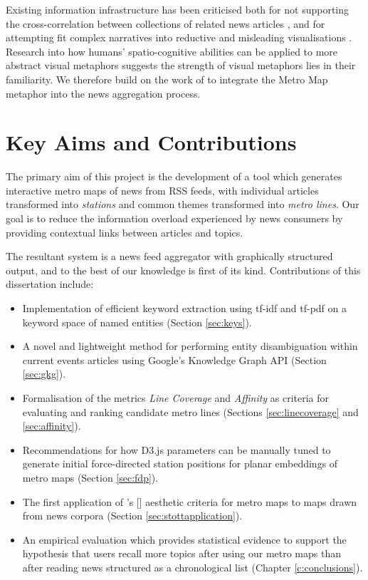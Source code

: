 Existing information infrastructure has been criticised both for not supporting the cross-correlation between collections of related news articles \citep{GalaxyOfNews}, and for attempting fit complex narratives into reductive and misleading visualisations \citep{InformationCartography}. Research into how humans' spatio-cognitive abilities can be applied to more abstract visual metaphors \citep{FromMetaphorToMethod} suggests the strength of visual metaphors lies in their familiarity. We therefore build on the work of \cite{GeneratingInformationMaps} to integrate the Metro Map metaphor into the news aggregation process.

\section*{Key Aims and Contributions}
The primary aim of this project is the development of a tool which generates interactive metro maps of news from RSS feeds, with individual articles transformed into \textit{stations} and common themes transformed into \textit{metro lines}. Our goal is to reduce the information overload experienced by news consumers by providing contextual links between articles and topics.

The resultant system is a news feed aggregator with graphically structured output, and to the best of our knowledge is first of its kind. Contributions of this dissertation include:\vspace{-0.3cm}
\begin{itemize}[itemsep=0.1em]
	\item Implementation of efficient keyword extraction using tf-idf \citep{tfidf} and tf-pdf \citep{TopicExtractionfromnewsArchiveUsingTFPDFAlgorithm} on a keyword space of named entities (Section \ref{sec:keys}).
	\item A novel and lightweight method for performing entity disambiguation within current events articles using Google's Knowledge Graph API (Section \ref{sec:gkg}).
	\item Formalisation of the metrics \textit{Line Coverage} and \textit{Affinity} as criteria for evaluating and ranking candidate metro lines (Sections \ref{sec:linecoverage} and \ref{sec:affinity}).
	\item Recommendations for how D3.js parameters can be manually tuned to generate initial force-directed station positions for planar embeddings of metro maps (Section \ref{sec:fdp}).
	\item The first application of \citeauthor{AutomaticMetroMapLayoutThesis}'s [\citeyear{AutomaticMetroMapLayoutThesis, AutomaticMetroMapLayout}] aesthetic criteria for metro maps to maps drawn from news corpora (Section \ref{sec:stottapplication}).
	\item An empirical evaluation which provides statistical evidence to support the hypothesis that users recall more topics after using our metro maps than after reading news structured as a chronological list (Chapter \ref{c:conclusions}). 
\end{itemize}
 

